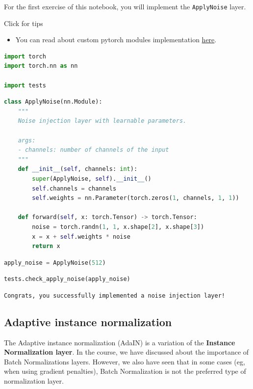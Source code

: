 For the first exercise of this notebook, you will implement the
\lstinline{ApplyNoise} layer.

Click for tips

\begin{itemize}
\item You can read about custom pytorch modules implementation \href{https://pytorch.org/tutorials/beginner/examples_nn/two_layer_net_module.html}{here}.
\end{itemize}

\begin{lstlisting}[language=Python]
import torch
import torch.nn as nn

import tests
\end{lstlisting}

\begin{lstlisting}[language=Python]
class ApplyNoise(nn.Module):
    """
    Noise injection layer with learnable parameters.
    
    args:
    - channels: number of channels of the input
    """
    def __init__(self, channels: int):
        super(ApplyNoise, self).__init__()
        self.channels = channels
        self.weights = nn.Parameter(torch.zeros(1, channels, 1, 1))
    
    def forward(self, x: torch.Tensor) -> torch.Tensor:
        noise = torch.randn(1, 1, x.shape[2], x.shape[3])
        x = x + self.weights * noise
        return x
\end{lstlisting}

\begin{lstlisting}[language=Python]
apply_noise = ApplyNoise(512)
\end{lstlisting}

\begin{lstlisting}[language=Python]
tests.check_apply_noise(apply_noise)
\end{lstlisting}

\begin{lstlisting}
Congrats, you successfully implemented a noise injection layer!
\end{lstlisting}

\subsection{Adaptive instance normalization}
The Adaptive instance normalization (AdaIN) is a variation of the
\textbf{Instance Normalization layer}. In the course, we have discussed
about the importance of Batch Normalizations layers. However, we also
have seen that in some cases (eg, when using gradient penalties), Batch
Normalization is not the preferred type of normalization layer. \newline

